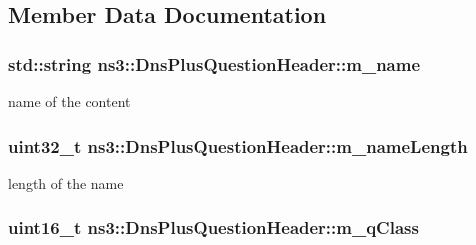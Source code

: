 \subsection{Member Data Documentation}
\hypertarget{classns3_1_1DnsPlusQuestionHeader_a37b7ee88822487ebb7515c4e6d711d9a}{
\subsubsection[{m\-\_\-name}]{\setlength{\rightskip}{0pt plus 5cm}std\-::string ns3\-::\-Dns\-Plus\-Question\-Header\-::m\-\_\-name\hspace{0.3cm}{\ttfamily [private]}}}\label{classns3_1_1DnsPlusQuestionHeader_a37b7ee88822487ebb7515c4e6d711d9a}


name of the content 

\hypertarget{classns3_1_1DnsPlusQuestionHeader_ad17e8994480e0dc6c79ae59a0e4a80c6}{
\subsubsection[{m\-\_\-name\-Length}]{\setlength{\rightskip}{0pt plus 5cm}uint32\-\_\-t ns3\-::\-Dns\-Plus\-Question\-Header\-::m\-\_\-name\-Length\hspace{0.3cm}{\ttfamily [private]}}}\label{classns3_1_1DnsPlusQuestionHeader_ad17e8994480e0dc6c79ae59a0e4a80c6}


length of the name 

\hypertarget{classns3_1_1DnsPlusQuestionHeader_a3bc213161b96f292d6e3d0dab3d42cba}{
\subsubsection[{m\-\_\-q\-Class}]{\setlength{\rightskip}{0pt plus 5cm}uint16\-\_\-t ns3\-::\-Dns\-Plus\-Question\-Header\-::m\-\_\-q\-Class\hspace{0.3cm}{\ttfamily [private]}}}\label{classns3_1_1DnsPlusQuestionHeader_a3bc213161b96f292d6e3d0dab3d42cba}


